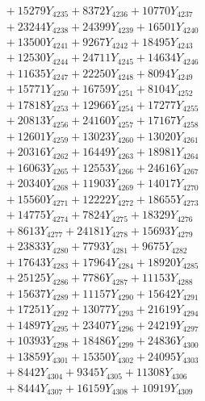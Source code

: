 \documentclass[a4paper,10pt]{article}
\begin{document}
{\begin{align}
&\;  + 15279 Y_{4235} + 8372 Y_{4236} + 10770 Y_{4237} \\[0.3ex]
&\;  + 23244 Y_{4238} + 24399 Y_{4239} + 16501 Y_{4240} \\[0.3ex]
&\;  + 13500 Y_{4241} + 9267 Y_{4242} + 18495 Y_{4243} \\[0.3ex]
&\;  + 12530 Y_{4244} + 24711 Y_{4245} + 14634 Y_{4246} \\[0.3ex]
&\;  + 11635 Y_{4247} + 22250 Y_{4248} + 8094 Y_{4249} \\[0.3ex]
&\;  + 15771 Y_{4250} + 16759 Y_{4251} + 8104 Y_{4252} \\[0.3ex]
&\;  + 17818 Y_{4253} + 12966 Y_{4254} + 17277 Y_{4255} \\[0.3ex]
&\;  + 20813 Y_{4256} + 24160 Y_{4257} + 17167 Y_{4258} \\[0.5ex]\allowbreak
&\;  + 12601 Y_{4259} + 13023 Y_{4260} + 13020 Y_{4261} \\[0.3ex]
&\;  + 20316 Y_{4262} + 16449 Y_{4263} + 18981 Y_{4264} \\[0.3ex]
&\;  + 16063 Y_{4265} + 12553 Y_{4266} + 24616 Y_{4267} \\[0.3ex]
&\;  + 20340 Y_{4268} + 11903 Y_{4269} + 14017 Y_{4270} \\[0.3ex]
&\;  + 15560 Y_{4271} + 12222 Y_{4272} + 18655 Y_{4273} \\[0.3ex]
&\;  + 14775 Y_{4274} + 7824 Y_{4275} + 18329 Y_{4276} \\[0.3ex]
&\;  + 8613 Y_{4277} + 24181 Y_{4278} + 15693 Y_{4279} \\[0.3ex]
&\;  + 23833 Y_{4280} + 7793 Y_{4281} + 9675 Y_{4282} \\[0.3ex]
&\;  + 17643 Y_{4283} + 17964 Y_{4284} + 18920 Y_{4285} \\[0.3ex]
&\;  + 25125 Y_{4286} + 7786 Y_{4287} + 11153 Y_{4288} \\[0.5ex]\allowbreak
&\;  + 15637 Y_{4289} + 11157 Y_{4290} + 15642 Y_{4291} \\[0.3ex]
&\;  + 17251 Y_{4292} + 13077 Y_{4293} + 21619 Y_{4294} \\[0.3ex]
&\;  + 14897 Y_{4295} + 23407 Y_{4296} + 24219 Y_{4297} \\[0.3ex]
&\;  + 10393 Y_{4298} + 18486 Y_{4299} + 24836 Y_{4300} \\[0.3ex]
&\;  + 13859 Y_{4301} + 15350 Y_{4302} + 24095 Y_{4303} \\[0.3ex]
&\;  + 8442 Y_{4304} + 9345 Y_{4305} + 11308 Y_{4306} \\[0.3ex]
&\;  + 8444 Y_{4307} + 16159 Y_{4308} + 10919 Y_{4309} \\[0.3ex]

\end{align}}
\end{document}
